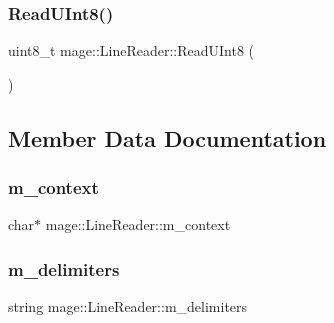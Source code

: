 \hypertarget{classmage_1_1_line_reader_a943ce0074c0861109f8b4ee10df8a221}{}\label{classmage_1_1_line_reader_a943ce0074c0861109f8b4ee10df8a221} 
\subsubsection{\texorpdfstring{Read\+U\+Int8()}{ReadUInt8()}}
{\footnotesize\ttfamily uint8\+\_\+t mage\+::\+Line\+Reader\+::\+Read\+U\+Int8 (\begin{DoxyParamCaption}{ }\end{DoxyParamCaption})\hspace{0.3cm}{\ttfamily [protected]}}



\subsection{Member Data Documentation}
\hypertarget{classmage_1_1_line_reader_a2f1cfe313dc89741386178e63a6b8b0c}{}\label{classmage_1_1_line_reader_a2f1cfe313dc89741386178e63a6b8b0c} 
\subsubsection{\texorpdfstring{m\+\_\+context}{m\_context}}
{\footnotesize\ttfamily char$\ast$ mage\+::\+Line\+Reader\+::m\+\_\+context\hspace{0.3cm}{\ttfamily [protected]}}

\hypertarget{classmage_1_1_line_reader_a6de3398ac59fdd98f8c40cff6f5c1075}{}\label{classmage_1_1_line_reader_a6de3398ac59fdd98f8c40cff6f5c1075} 
\subsubsection{\texorpdfstring{m\+\_\+delimiters}{m\_delimiters}}
{\footnotesize\ttfamily string mage\+::\+Line\+Reader\+::m\+\_\+delimiters\hspace{0.3cm}{\ttfamily [private]}}

\hypertarget{classmage_1_1_line_reader_ad6f55ba12fc610ab2fc1c26a48d12321}{}\label{classmage_1_1_line_reader_ad6f55ba12fc610ab2fc1c26a48d12321} 
